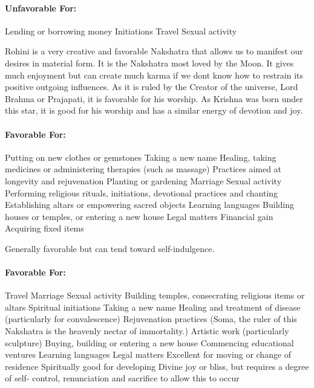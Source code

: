 \paragraph{Unfavorable For:}

Lending or borrowing money
Initiations
Travel
Sexual activity
 


Rohini is a very creative and favorable Nakshatra that allows us to manifest our desires in material form. It is the Nakshatra most loved by the Moon. It gives much enjoyment but can create much karma if we dont know how to restrain its positive outgoing influences. As it is ruled by the Creator of the universe, Lord Brahma or Prajapati, it is favorable for his worship. As Krishna was born under this star, it is good for his worship and has a similar energy of devotion and joy.

 

\paragraph{Favorable For:}

Putting on new clothes or gemstones
Taking a new name
Healing, taking medicines or administering therapies (such as massage)
Practices aimed at longevity and rejuvenation
Planting or gardening
Marriage
Sexual activity
Performing religious rituals, initiations, devotional practices and chanting Establishing altars or empowering sacred objects
Learning languages
Building houses or temples, or entering a new house
Legal matters
Financial gain
Acquiring fixed items
 


Generally favorable but can tend toward self-indulgence.

 

\paragraph{Favorable For:}

Travel
Marriage
Sexual activity
Building temples, consecrating religious items or altars
Spiritual initiations
Taking a new name
Healing and treatment of disease (particularly for convalescence)
Rejuvenation practices (Soma, the ruler of this Nakshatra is the heavenly nectar of immortality.)
Artistic work (particularly sculpture)
Buying, building or entering a new house
Commencing educational ventures
Learning languages
Legal matters
Excellent for moving or change of residence
Spiritually good for developing Divine joy or bliss, but requires a degree of self- control, renunciation and sacrifice to allow this to occur
 

